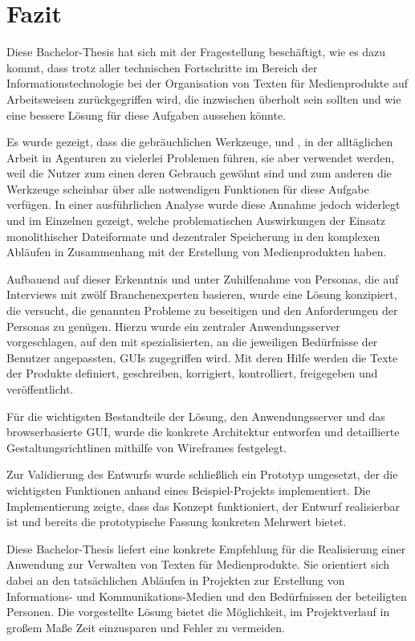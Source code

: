 \section{Fazit}\label{l:fazit}

Diese Bachelor-Thesis hat sich mit der Fragestellung beschäftigt, wie es dazu kommt, dass trotz aller technischen Fortschritte im Bereich der Informationstechnologie bei der Organisation von Texten für Medienprodukte auf Arbeitsweisen zurückgegriffen wird, die inzwischen überholt sein sollten und wie eine bessere Lösung für diese Aufgaben aussehen könnte.

Es wurde gezeigt, dass die gebräuchlichen Werkzeuge,  und , in der alltäglichen Arbeit in Agenturen zu vielerlei Problemen führen, sie aber verwendet werden, weil die Nutzer zum einen deren Gebrauch gewöhnt sind und zum anderen die Werkzeuge scheinbar über alle notwendigen Funktionen für diese Aufgabe verfügen. In einer ausführlichen Analyse wurde diese Annahme jedoch widerlegt und im Einzelnen gezeigt, welche problematischen Auswirkungen der Einsatz monolithischer Dateiformate und dezentraler Speicherung in den komplexen Abläufen in Zusammenhang mit der Erstellung von Medienprodukten haben.

Aufbauend auf dieser Erkenntnis und unter Zuhilfenahme von Personas, die auf Interviews mit zwölf Branchenexperten basieren, wurde eine Lösung konzipiert, die versucht, die genannten Probleme zu beseitigen und den Anforderungen der Personas zu genügen. Hierzu wurde ein zentraler Anwendungsserver vorgeschlagen, auf den mit spezialisierten, an die jeweiligen Bedürfnisse der Benutzer angepassten, GUIs zugegriffen wird. Mit deren Hilfe werden die Texte der Produkte definiert, geschreiben, korrigiert, kontrolliert, freigegeben und veröffentlicht.

Für die wichtigsten Bestandteile der Lösung, den Anwendungsserver und das browserbasierte GUI, wurde die konkrete Architektur entworfen und detaillierte Gestaltungsrichtlinen mithilfe von Wireframes festgelegt.

Zur Validierung des Entwurfs wurde schließlich ein Prototyp umgesetzt, der die wichtigsten Funktionen anhand eines Beispiel-Projekts implementiert. Die Implementierung zeigte, dass das Konzept funktioniert, der Entwurf realisierbar ist und bereits die prototypische Fassung konkreten Mehrwert bietet.

\secbar

Diese Bachelor-Thesis liefert eine konkrete Empfehlung für die Realisierung einer Anwendung zur Verwalten von Texten für Medienprodukte. Sie orientiert sich dabei an den tatsächlichen Abläufen in Projekten zur Erstellung von Informations- und Kommunikations-Medien und den Bedürfnissen der beteiligten Personen. Die vorgestellte Lösung bietet die Möglichkeit, im Projektverlauf in großem Maße Zeit einzusparen und Fehler zu vermeiden.

\pagebreak